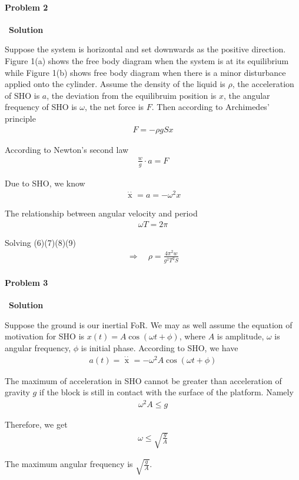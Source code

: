 \documentclass[12pt,a4paper]{article}
\begin{document}
\paragraph{\large \textbf{Problem 2}}~{\textbf{Solution}}
\vspace{2mm}
\par Suppose the system is horizontal and set downwards as the positive direction. Figure 1(a) shows the free body diagram when the system is at its equilibrium while Figure 1(b) shows free body diagram when there is a minor disturbance applied onto the cylinder. Assume the density of the liquid is $\rho$, the acceleration of SHO is $a$, the deviation from the equilibruim position is $x$, the angular frequency of SHO is $\omega$, the net force is $F$. Then according to Archimedes’ principle
\begin{align}
	F = -\rho gSx
\end{align}
\par According to Newton's second law
\begin{align}
	\frac{w}{g}\cdot a = F
\end{align}
\par Due to SHO, we know
\begin{align}
	\mathop{x}\limits^{\cdot\cdot} = a = -\omega^2x
\end{align}
\par The relationship between angular velocity and period
\begin{align}
	\omega T = 2\pi
\end{align}
\par Solving (6)(7)(8)(9)
\begin{align}
\Rightarrow\quad \rho = \frac{4\pi^2w}{g^2T^2S}
\end{align}

\paragraph{\large \textbf{Problem 3}}~{\textbf{Solution}}
\vspace{2mm}
\par Suppose the ground is our inertial FoR. We may as well assume the equation of motivation for SHO is $x(t) = A\cos(\omega t+\phi)$, where $A$ is amplitude, $\omega$ is angular frequency, $\phi$ is initial phase. According to SHO, we have
\begin{align*}
	a(t) = \mathop{x(t)}\limits^{\cdot\cdot} = -\omega^2A\cos(\omega t+\phi)
\end{align*}
\par The maximum of acceleration in SHO cannot be greater than acceleration of gravity $g$ if the block is still in contact with the surface of the platform. Namely
\begin{align*}
	\omega^2A \leq g
\end{align*}
\par Therefore, we get
\begin{align*}
	\omega \leq \sqrt{\frac{g}{A}}
\end{align*}
\par The maximum angular frequency is $\sqrt{\frac{g}{A}}$.
\end{document}
